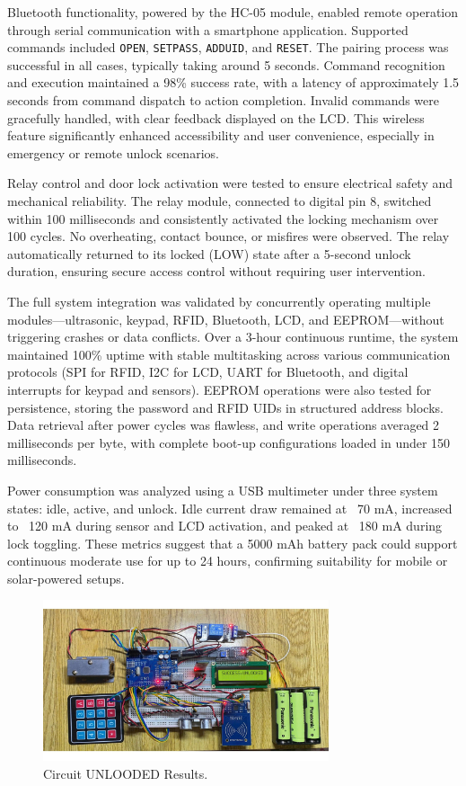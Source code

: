 \documentclass[conference, onecolumn]{IEEEtran}
\begin{document}
Bluetooth functionality, powered by the HC-05 module, enabled remote operation through serial communication with a smartphone application. Supported commands included \texttt{OPEN}, \texttt{SETPASS}, \texttt{ADDUID}, and \texttt{RESET}. The pairing process was successful in all cases, typically taking around 5 seconds. Command recognition and execution maintained a 98\% success rate, with a latency of approximately 1.5 seconds from command dispatch to action completion. Invalid commands were gracefully handled, with clear feedback displayed on the LCD. This wireless feature significantly enhanced accessibility and user convenience, especially in emergency or remote unlock scenarios.

Relay control and door lock activation were tested to ensure electrical safety and mechanical reliability. The relay module, connected to digital pin 8, switched within 100 milliseconds and consistently activated the locking mechanism over 100 cycles. No overheating, contact bounce, or misfires were observed. The relay automatically returned to its locked (LOW) state after a 5-second unlock duration, ensuring secure access control without requiring user intervention.

The full system integration was validated by concurrently operating multiple modules—ultrasonic, keypad, RFID, Bluetooth, LCD, and EEPROM—without triggering crashes or data conflicts. Over a 3-hour continuous runtime, the system maintained 100\% uptime with stable multitasking across various communication protocols (SPI for RFID, I2C for LCD, UART for Bluetooth, and digital interrupts for keypad and sensors). EEPROM operations were also tested for persistence, storing the password and RFID UIDs in structured address blocks. Data retrieval after power cycles was flawless, and write operations averaged 2 milliseconds per byte, with complete boot-up configurations loaded in under 150 milliseconds.

Power consumption was analyzed using a USB multimeter under three system states: idle, active, and unlock. Idle current draw remained at ~70 mA, increased to ~120 mA during sensor and LCD activation, and peaked at ~180 mA during lock toggling. These metrics suggest that a 5000 mAh battery pack could support continuous moderate use for up to 24 hours, confirming suitability for mobile or solar-powered setups.

\begin{figure}[H]
	\centering
	\includegraphics[width=0.75\textwidth]{mohinhsuse.jpg}
	\caption{Circuit UNLOODED Results.}
	\label{fig10}
\end{figure}	
\end{document}
